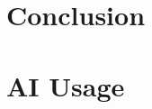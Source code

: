 \documentclass[12pt, a4paper]{report}
\begin{document}
\chapter{Conclusion}





\chapter*{AI Usage}



\appendix

\end{document}
